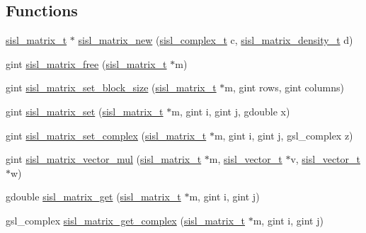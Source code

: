 \subsection*{Functions}
\begin{DoxyCompactItemize}
\item 
\hyperlink{group__matrix_gad147923587b355644defb9bfbf981740}{sisl\-\_\-matrix\-\_\-t} $\ast$ \hyperlink{group__matrix_ga29ab0c52a1e38fc785031c5e93e4ca98}{sisl\-\_\-matrix\-\_\-new} (\hyperlink{group__vector_gadbf341f8965fc86dda28912ab5f04930}{sisl\-\_\-complex\-\_\-t} c, \hyperlink{group__matrix_gae50d4f05ed96de495bdd326c201c28ff}{sisl\-\_\-matrix\-\_\-density\-\_\-t} d)
\item 
gint \hyperlink{group__matrix_ga35de2cf4acfbe6e820f895a2ace8b328}{sisl\-\_\-matrix\-\_\-free} (\hyperlink{group__matrix_gad147923587b355644defb9bfbf981740}{sisl\-\_\-matrix\-\_\-t} $\ast$m)
\item 
gint \hyperlink{group__matrix_ga4dbf57c7f1ff8a417425b978b85ceefc}{sisl\-\_\-matrix\-\_\-set\-\_\-block\-\_\-size} (\hyperlink{group__matrix_gad147923587b355644defb9bfbf981740}{sisl\-\_\-matrix\-\_\-t} $\ast$m, gint rows, gint columns)
\item 
gint \hyperlink{group__matrix_ga67a577100e392546e9b3833415c739fd}{sisl\-\_\-matrix\-\_\-set} (\hyperlink{group__matrix_gad147923587b355644defb9bfbf981740}{sisl\-\_\-matrix\-\_\-t} $\ast$m, gint i, gint j, gdouble x)
\item 
gint \hyperlink{group__matrix_ga13808fa06a8b9d648152ae25ef7996d7}{sisl\-\_\-matrix\-\_\-set\-\_\-complex} (\hyperlink{group__matrix_gad147923587b355644defb9bfbf981740}{sisl\-\_\-matrix\-\_\-t} $\ast$m, gint i, gint j, gsl\-\_\-complex z)
\item 
gint \hyperlink{group__matrix_ga56825a47cadc80aa00795feedeb002bc}{sisl\-\_\-matrix\-\_\-vector\-\_\-mul} (\hyperlink{group__matrix_gad147923587b355644defb9bfbf981740}{sisl\-\_\-matrix\-\_\-t} $\ast$m, \hyperlink{group__vector_gacbac585492f5005f05f0c0b8463039be}{sisl\-\_\-vector\-\_\-t} $\ast$v, \hyperlink{group__vector_gacbac585492f5005f05f0c0b8463039be}{sisl\-\_\-vector\-\_\-t} $\ast$w)
\item 
gdouble \hyperlink{group__matrix_ga441d1109b3297e94b7c4fba2b618ea0c}{sisl\-\_\-matrix\-\_\-get} (\hyperlink{group__matrix_gad147923587b355644defb9bfbf981740}{sisl\-\_\-matrix\-\_\-t} $\ast$m, gint i, gint j)
\item 
gsl\-\_\-complex \hyperlink{group__matrix_ga0a0ea595d8beec73a6673101ad348add}{sisl\-\_\-matrix\-\_\-get\-\_\-complex} (\hyperlink{group__matrix_gad147923587b355644defb9bfbf981740}{sisl\-\_\-matrix\-\_\-t} $\ast$m, gint i, gint j)
\end{DoxyCompactItemize}


